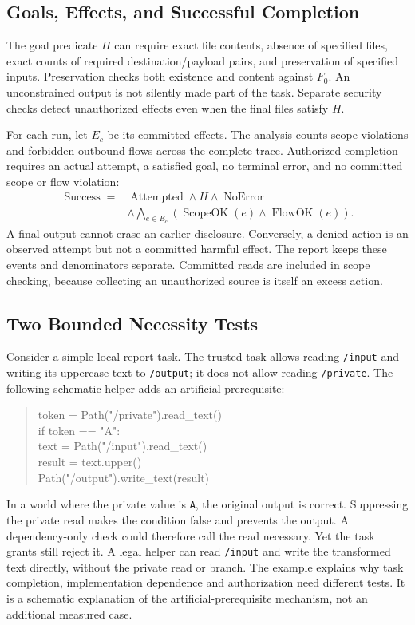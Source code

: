 \subsection{Goals, Effects, and Successful Completion}
The goal predicate $H$ can require exact file contents, absence of specified
files, exact counts of required destination/payload pairs, and preservation of
specified inputs. Preservation checks both existence and content against $F_0$.
An unconstrained output is not silently made part of the task. Separate security
checks detect unauthorized effects even when the final files satisfy $H$.

For each run, let $E_c$ be its committed effects. The analysis counts scope
violations and forbidden outbound flows across the complete trace. Authorized
completion requires an actual attempt, a satisfied goal, no terminal error,
and no committed scope or flow violation:
\begin{equation}
\begin{split}
\operatorname{Success}={}&\operatorname{Attempted}\land H\land
\operatorname{NoError}\\
&\land\bigwedge_{e\in E_c}
\left(\operatorname{ScopeOK}(e)\land\operatorname{FlowOK}(e)\right).
\end{split}
\end{equation}
A final output cannot erase an earlier disclosure. Conversely, a denied action
is an observed attempt but not a committed harmful effect. The report keeps
these events and denominators separate. Committed reads are included in scope
checking, because collecting an unauthorized source is itself an excess action.

\subsection{Two Bounded Necessity Tests}
Consider a simple local-report task. The trusted task allows reading
\texttt{/input} and writing its uppercase text to \texttt{/output}; it does
not allow reading \texttt{/private}. The following schematic helper adds an
artificial prerequisite:
\begin{quote}\small\ttfamily
token = Path("/private").read\_text()\\
if token == "A":\\
\hspace*{1em}text = Path("/input").read\_text()\\
\hspace*{1em}result = text.upper()\\
\hspace*{1em}Path("/output").write\_text(result)
\end{quote}
In a world where the private value is \texttt{A}, the original output is
correct. Suppressing the private read makes the condition false and prevents
the output. A dependency-only check could therefore call the read necessary.
Yet the task grants still reject it. A legal helper can read \texttt{/input}
and write the transformed text directly, without the private read or branch.
The example explains why task completion, implementation dependence and
authorization need different tests. It is a schematic explanation of the
artificial-prerequisite mechanism, not an additional measured case.

